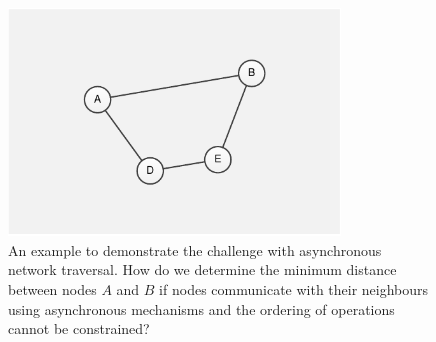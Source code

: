 
\begin{figure}[!t]
\begin{center}

\vspace{2.3cm}

\includegraphics[width=8.8cm]{figures/fig_async}

\caption{An example to demonstrate the challenge with asynchronous network
traversal. How do we determine the minimum distance between nodes $A$ and $B$
if nodes communicate with their neighbours using asynchronous mechanisms and
the ordering of operations cannot be constrained?}

\label{fig_async}
\end{center}

\end{figure}
